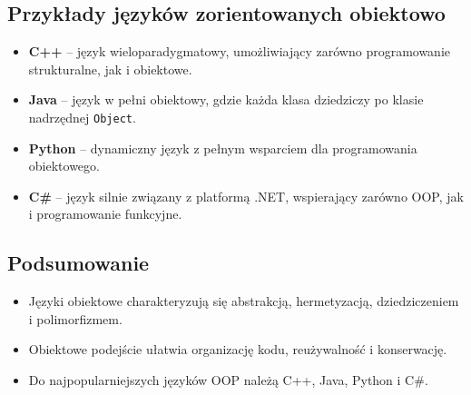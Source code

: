 \subsection{Przykłady języków zorientowanych obiektowo}
\begin{itemize}
    \item \textbf{C++} – język wieloparadygmatowy, umożliwiający zarówno programowanie strukturalne, jak i obiektowe.
    \item \textbf{Java} – język w pełni obiektowy, gdzie każda klasa dziedziczy po klasie nadrzędnej \texttt{Object}.
    \item \textbf{Python} – dynamiczny język z pełnym wsparciem dla programowania obiektowego.
    \item \textbf{C\#} – język silnie związany z platformą .NET, wspierający zarówno OOP, jak i programowanie funkcyjne.
\end{itemize}

\subsection{Podsumowanie}
\begin{itemize}
    \item Języki obiektowe charakteryzują się abstrakcją, hermetyzacją, dziedziczeniem i polimorfizmem.
    \item Obiektowe podejście ułatwia organizację kodu, reużywalność i konserwację.
    \item Do najpopularniejszych języków OOP należą C++, Java, Python i C\#.
\end{itemize}
